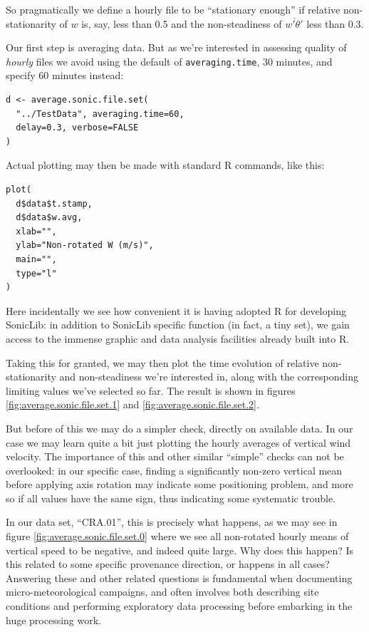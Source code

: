 \documentclass[a4paper,10pt]{book}
\begin{document}
So pragmatically we define a hourly file to be ``stationary enough'' if relative non-stationarity of $w$ is, say, less than 0.5 and the non-steadiness of $\overline{w'\theta'}$ less than 0.3.

Our first step is averaging data. But as we're interested in assessing quality of \emph{hourly} files we avoid using the default of \verb|averaging.time|, 30 minutes, and specify 60 minutes instead:

\begin{verbatim}
d <- average.sonic.file.set(
  "../TestData", averaging.time=60,
  delay=0.3, verbose=FALSE
)
\end{verbatim} 

\noindent Actual plotting may then be made with standard R commands, like this:

\begin{verbatim}
plot(
  d$data$t.stamp,
  d$data$w.avg,
  xlab="",
  ylab="Non-rotated W (m/s)",
  main="",
  type="l"
)
\end{verbatim} 

Here incidentally we see how convenient it is having adopted R for developing SonicLib: in addition to SonicLib specific function (in fact, a tiny set), we gain access to the immense graphic and data analysis facilities already built into R.

Taking this for granted, we may then plot the time evolution of relative non-stationarity and non-steadiness we're interested in, along with the corresponding limiting values we've selected so far. The result is shown in figures \ref{fig:average.sonic.file.set.1} and \ref{fig:average.sonic.file.set.2}.

But before of this we may do a simpler check, directly on available data. In our case we may learn quite a bit just plotting the hourly averages of vertical wind velocity. The importance of this and other similar ``simple'' checks can not be overlooked: in our specific case, finding a significantly non-zero vertical mean before applying axis rotation may indicate some positioning problem, and more so if all values have the same sign, thus indicating some systematic trouble.

In our data set, ``CRA.01'', this is precisely what happens, as we may see in figure \ref{fig:average.sonic.file.set.0} where we see all non-rotated hourly means of vertical speed to be negative, and indeed quite large. Why does this happen? Is this related to some specific provenance direction, or happens in all cases? Answering these and other related questions is fundamental when documenting micro-meteorological campaigns, and often involves both describing site conditions and performing exploratory data processing before embarking in the huge processing work.
\end{document}
